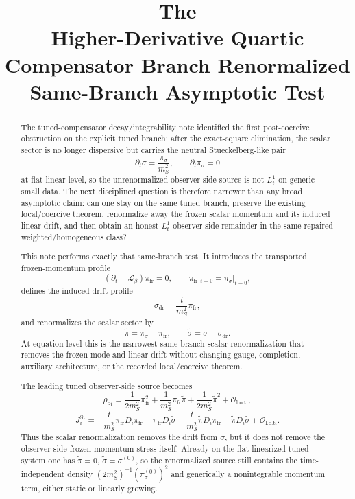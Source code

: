 \documentclass[11pt]{article}
\title{\textbf{The \TheoryName{}}\\[0.4em]
\large Higher-Derivative Quartic Compensator Branch Renormalized Same-Branch Asymptotic Test}
\author{}
\date{}
\newcommand{\Ell}{\mathcal{L}}
\begin{document}
\maketitle

\begin{abstract}
The tuned-compensator decay/integrability note identified the first post-coercive obstruction on the explicit tuned branch: after the exact-square elimination, the scalar sector is no longer dispersive but carries the neutral Stueckelberg-like pair
\[
\partial_t\sigma=\frac{\pi_\sigma}{m_S^2},
\qquad
\partial_t\pi_\sigma=0
\]
at flat linear level, so the unrenormalized observer-side source is not \(L_t^1\) on generic small data. The next disciplined question is therefore narrower than any broad asymptotic claim: can one stay on the same tuned branch, preserve the existing local/coercive theorem, renormalize away the frozen scalar momentum and its induced linear drift, and then obtain an honest \(L_t^1\) observer-side remainder in the same repaired weighted/homogeneous class?

This note performs exactly that same-branch test. It introduces the transported frozen-momentum profile
\[
(\partial_t-\Ell_\beta)\pi_{\mathrm{fr}}=0,
\qquad
\pi_{\mathrm{fr}}|_{t=0}=\pi_\sigma|_{t=0},
\]
defines the induced drift profile
\[
\sigma_{\mathrm{dr}}=\frac{t}{m_S^2}\pi_{\mathrm{fr}},
\]
and renormalizes the scalar sector by
\[
\widetilde{\pi}=\pi_\sigma-\pi_{\mathrm{fr}},
\qquad
\widetilde{\sigma}=\sigma-\sigma_{\mathrm{dr}}.
\]
At equation level this is the narrowest same-branch scalar renormalization that removes the frozen mode and linear drift without changing gauge, completion, auxiliary architecture, or the recorded local/coercive theorem.

The leading tuned observer-side source becomes
\[
\rho_{\mathrm{St}}
=
\frac{1}{2m_S^2}\pi_{\mathrm{fr}}^2
+\frac{1}{m_S^2}\pi_{\mathrm{fr}}\widetilde{\pi}
+\frac{1}{2m_S^2}\widetilde{\pi}^2
+\mathcal O_{\mathrm{l.o.t.}},
\]
\[
J_i^{\mathrm{St}}
=
-\frac{t}{m_S^2}\pi_{\mathrm{fr}}D_i\pi_{\mathrm{fr}}
-\pi_{\mathrm{fr}}D_i\widetilde{\sigma}
-\frac{t}{m_S^2}\widetilde{\pi}D_i\pi_{\mathrm{fr}}
-\widetilde{\pi}D_i\widetilde{\sigma}
+\mathcal O_{\mathrm{l.o.t.}}.
\]
Thus the scalar renormalization removes the drift from \(\sigma\), but it does not remove the observer-side frozen-momentum stress itself. Already on the flat linearized tuned system one has \(\widetilde{\pi}=0\), \(\widetilde{\sigma}=\sigma^{(0)}\), so the renormalized source still contains the time-independent density \((2m_S^2)^{-1}(\pi_\sigma^{(0)})^2\) and generically a nonintegrable momentum term, either static or linearly growing.


\end{abstract}
\end{document}
